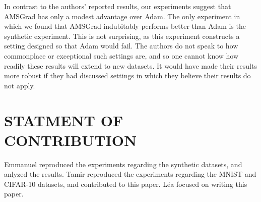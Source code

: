 \documentclass[letterpaper, 10 pt, conference]{ieeeconf}  %
\begin{document}
In contrast to the authors' reported results, our experiments suggest that AMSGrad has only a modest advantage over Adam. The only experiment in which we found that AMSGrad indubitably performs better than Adam is the synthetic experiment. This is not surprising, as this experiment constructs a setting designed so that Adam would fail. The authors do not speak to how commonplace or exceptional such settings are, and so one cannot know how readily these results will extend to new datasets. It would have made their results more robust if they had discussed settings in which they believe their results do not apply.

\section{STATMENT OF CONTRIBUTION}

Emmanuel reproduced the experiments regarding the synthetic datasets, and anlyzed the results. Tamir reproduced the experiments regarding the MNIST and CIFAR-10 datasets, and contributed to this paper. L\'ea  focused on writing this paper. 
 
\addtolength{\textheight}{-12cm}   %

\end{document}
